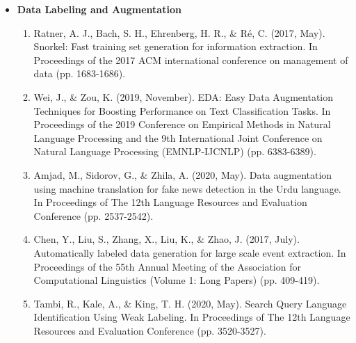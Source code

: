 \documentclass[11pt,a4paper]{article}
\begin{document}
\begin{itemize}
\item \textbf{Data Labeling and Augmentation}
\begin{enumerate}
     \item Ratner, A. J., Bach, S. H., Ehrenberg, H. R., \& Ré, C. (2017, May). Snorkel: Fast training set generation for information extraction. In Proceedings of the 2017 ACM international conference on management of data (pp. 1683-1686).
    \item Wei, J., \& Zou, K. (2019, November). EDA: Easy Data Augmentation Techniques for Boosting Performance on Text Classification Tasks. In Proceedings of the 2019 Conference on Empirical Methods in Natural Language Processing and the 9th International Joint Conference on Natural Language Processing (EMNLP-IJCNLP) (pp. 6383-6389).
    \item Amjad, M., Sidorov, G., \& Zhila, A. (2020, May). Data augmentation using machine translation for fake news detection in the Urdu language. In Proceedings of The 12th Language Resources and Evaluation Conference (pp. 2537-2542).
    \item Chen, Y., Liu, S., Zhang, X., Liu, K., \& Zhao, J. (2017, July). Automatically labeled data generation for large scale event extraction. In Proceedings of the 55th Annual Meeting of the Association for Computational Linguistics (Volume 1: Long Papers) (pp. 409-419).
    \item Tambi, R., Kale, A., \& King, T. H. (2020, May). Search Query Language Identification Using Weak Labeling. In Proceedings of The 12th Language Resources and Evaluation Conference (pp. 3520-3527).
\end{enumerate}


\end{itemize}
\end{document}
